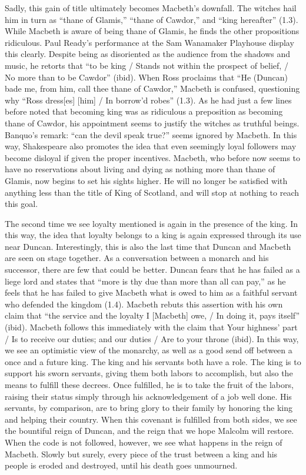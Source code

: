 \documentclass[12pt]{article}[titlepage]
\newcommand{\say}[1]{``#1''}
\newcommand{\1}{\={a}}
\newcommand{\2}{\={e}}
\newcommand{\3}{\={\i}}
\newcommand{\4}{\=o}
\newcommand{\5}{\=u}
\newcommand{\6}{\={A}}
\renewcommand{\,}{\textsuperscript{,}}
\begin{document}
Sadly, this gain of title ultimately becomes Macbeth's downfall.
The witches hail him in turn as \say{thane of Glamis,} \say{thane of Cawdor,} and \say{king hereafter} (1.3).
While Macbeth is aware of being thane of Glamis, he finds the other propositions ridiculous.
Paul Ready's performance at the Sam Wanamaker Playhouse display this clearly.
Despite being as disoriented as the audience from the shadows and music, he retorts that \say{to be king / Stands not within the prospect of belief, / No more than to be Cawdor} (ibid).
When Ross proclaims that \say{He (Duncan) bade me, from him, call thee thane of Cawdor,} Macbeth is confused, questioning why \say{Ross dress[es] [him] / In borrow'd robes} (1.3).
As he had just a few lines before noted that becoming king was as ridiculous a preposition as becoming thane of Cawdor, his appointment seems to justify the witches as truthful beings.
Banquo's remark: \say{can the devil speak true?} seems ignored by Macbeth.
In this way, Shakespeare also promotes the idea that even seemingly loyal followers may become disloyal if given the proper incentives.
Macbeth, who before now seems to have no reservations about living and dying as nothing more than thane of Glamis, now begins to set his sights higher.
He will no longer be satisfied with anything less than the title of King of Scotland, and will stop at nothing to reach this goal.

The second time we see loyalty mentioned is again in the presence of the king.
In this way, the idea that loyalty belongs to a king is again expressed through its use near Duncan.
Interestingly, this is also the last time that Duncan and Macbeth are seen on stage together.
As a conversation between a monarch and his successor, there are few that could be better.
Duncan fears that he has failed as a liege lord and states that \say{more is thy due than more than all can pay,} as he feels that he has failed to give Macbeth what is owed to him as a faithful servant who defended the kingdom (1.4).
Macbeth rebuts this assertion with his own claim that \say{the service and the loyalty I [Macbeth] owe, / In doing it, pays itself} (ibid).
Macbeth follows this immediately with the claim that {Your highness' part / Is to receive our duties; and our duties / Are to your throne} (ibid).
In this way, we see an optimistic view of the monarchy, as well as a good send off between a once and a future king.
The king and his servants both have a role.
The king is to support his sworn servants, giving them both labors to accomplish, but also the means to fulfill these decrees.
Once fulfilled, he is to take the fruit of the labors, raising their status simply through his acknowledgement of a job well done.
His servants, by comparison, are to bring glory to their family by honoring the king and helping their country.
When this covenant is fulfilled from both sides, we see the bountiful reign of Duncan, and the reign that we hope Malcolm will restore.
When the code is not followed, however, we see what happens in the reign of Macbeth.
Slowly but surely, every piece of the trust between a king and his people is eroded and destroyed, until his death goes unmourned.
\end{document}
